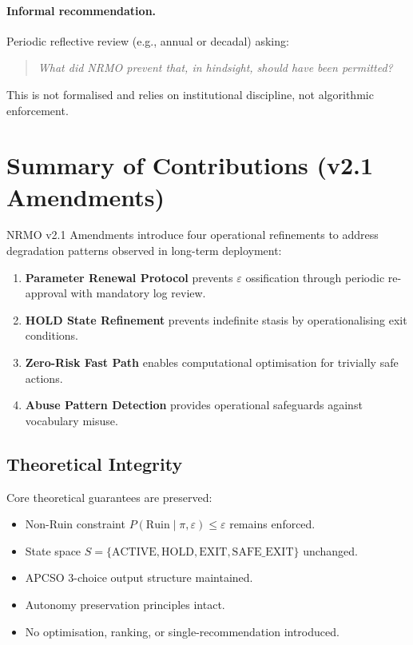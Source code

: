 \paragraph{Informal recommendation.}
Periodic reflective review (e.g., annual or decadal) asking:

\begin{quote}
\itshape
What did NRMO prevent that, in hindsight, should have been
permitted?
\end{quote}

\noindent
This is not formalised and relies on institutional discipline, not
algorithmic enforcement.

\section{Summary of Contributions (v2.1 Amendments)}
\label{sec:v21-summary}

NRMO v2.1 Amendments introduce four operational refinements to
address degradation patterns observed in long-term deployment:

\begin{enumerate}
\item \textbf{Parameter Renewal Protocol} prevents $\varepsilon$
ossification through periodic re-approval with mandatory log review.
\item \textbf{HOLD State Refinement} prevents indefinite stasis by
operationalising exit conditions.
\item \textbf{Zero-Risk Fast Path} enables computational optimisation
for trivially safe actions.
\item \textbf{Abuse Pattern Detection} provides operational
safeguards against vocabulary misuse.
\end{enumerate}

\subsection{Theoretical Integrity}

Core theoretical guarantees are preserved:

\begin{itemize}
\item Non-Ruin constraint
$P(\mathrm{Ruin} \mid \pi, \varepsilon) \le \varepsilon$ remains
enforced.
\item State space $S = \{\mathrm{ACTIVE}, \mathrm{HOLD},
\mathrm{EXIT}, \mathrm{SAFE\_EXIT}\}$ unchanged.
\item APCSO 3-choice output structure maintained.
\item Autonomy preservation principles intact.
\item No optimisation, ranking, or single-recommendation introduced.
\end{itemize}

